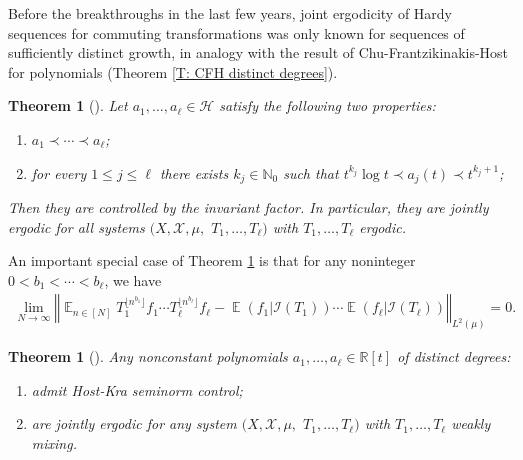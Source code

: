 \documentclass[11pt]{amsart}
\newtheorem{theorem}[lemma]{Theorem}
\theoremstyle{definition}
\DeclareMathOperator*{\E}{\mathbb{E}}
\newcommand{\N}{{\mathbb N}}
\newcommand{\R}{{\mathbb R}}
\newcommand{\CH}{{\mathcal H}}
\newcommand{\CI}{{\mathcal I}}
\newcommand{\CX}{{\mathcal X}}
\newcommand{\norm}[1]{\left\Vert #1\right\Vert}
\newcommand{\1}{{\mathbf{1}}}
\newcommand{\sfloor}[1]{{\lfloor #1 \rfloor}}
\begin{document}
Before the breakthroughs in the last few years, joint ergodicity of Hardy sequences for commuting transformations was only known for sequences of sufficiently distinct growth, in analogy with the result of Chu-Frantzikinakis-Host for polynomials (Theorem \ref{T: CFH distinct degrees}).
\begin{theorem}%
[{\cite[Theorem 2.2]{Fr10}}]\label{T: Fr distinct-growth Hardy}
    Let $a_1, \ldots, a_\ell\in\CH$ satisfy the following two properties:
    \begin{enumerate}
        \item $a_1 \prec \cdots \prec a_\ell$;
        \item for every $1\leq j\leq \ell$ there exists $k_j\in\N_0$ such that $t^{k_j}\log t \prec a_j(t)\prec t^{k_j+1}$;
    \end{enumerate}
    Then they are controlled by the invariant factor. In particular, they are jointly ergodic for all systems $(X, \CX, \mu,$\! $T_1, \ldots, T_\ell)$ with $T_1, \ldots, T_\ell$ ergodic. 
\end{theorem}
An important special case of Theorem \ref{T: Fr distinct-growth Hardy} is that for any noninteger $0<b_1<\cdots < b_\ell$, we have
\begin{align*}
    \lim_{N\to\infty}\norm{\E_{n\in[N]}T_1^{\sfloor{n^{b_1}}}f_1\cdots T_\ell^{\sfloor{n^{b_\ell}}}f_\ell - \E(f_1|\CI(T_1))\cdots \E(f_\ell|\CI(T_\ell))}_{L^2(\mu)} = 0.
\end{align*}
\begin{theorem}%
[{\cite[Corollary 1.7]{Ko18}}]\label{T: Kouts distinct-degree polys}
    Any nonconstant polynomials $a_1, \ldots, a_\ell\in\R[t]$ of distinct degrees:
    \begin{enumerate}
        \item admit Host-Kra seminorm control;
        \item are jointly ergodic for any system $(X, \CX, \mu,$\! $T_1, \ldots, T_\ell)$ with $T_1, \ldots, T_\ell$ weakly mixing.
    \end{enumerate}
\end{theorem}
\end{document}
